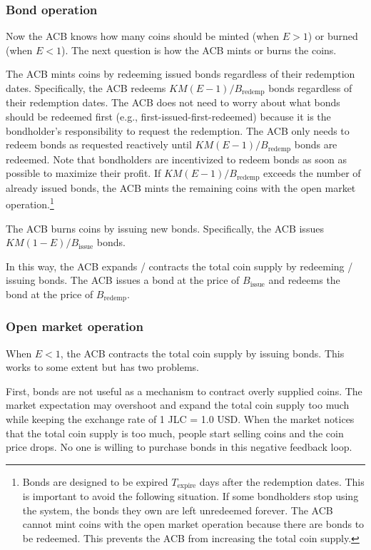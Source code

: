 \documentclass[dvipdfmx,a4paper]{article}
\begin{document}
\subsubsection{Bond operation}

Now the ACB knows how many coins should be minted (when $E>1$) or burned (when $E<1$). The next question is how the ACB mints or burns the coins.

The ACB mints coins by redeeming issued bonds regardless of their redemption dates. Specifically, the ACB redeems $KM(E-1)/B_{\mathrm{redemp}}$ bonds regardless of their redemption dates. The ACB does not need to worry about what bonds should be redeemed first (e.g., first-issued-first-redeemed) because it is the bondholder's responsibility to request the redemption. The ACB only needs to redeem bonds as requested reactively until $KM(E-1)/B_{\mathrm{redemp}}$ bonds are redeemed. Note that bondholders are incentivized to redeem bonds as soon as possible to maximize their profit. If $KM(E-1)/B_{\mathrm{redemp}}$ exceeds the number of already issued bonds, the ACB mints the remaining coins with the open market operation.\footnote{Bonds are designed to be expired $T_{\mathrm{expire}}$ days after the redemption dates. This is important to avoid the following situation. If some bondholders stop using the system, the bonds they own are left unredeemed forever. The ACB cannot mint coins with the open market operation because there are bonds to be redeemed. This prevents the ACB from increasing the total coin supply.}

The ACB burns coins by issuing new bonds. Specifically, the ACB issues $KM(1-E)/B_{\mathrm{issue}}$ bonds.

In this way, the ACB expands / contracts the total coin supply by redeeming / issuing bonds. The ACB issues a bond at the price of $B_{\mathrm{issue}}$ and redeems the bond at the price of $B_{\mathrm{redemp}}$.

\subsubsection{Open market operation}

When $E<1$, the ACB contracts the total coin supply by issuing bonds. This works to some extent but has two problems.

First, bonds are not useful as a mechanism to contract overly supplied coins. The market expectation may overshoot and expand the total coin supply too much while keeping the exchange rate of 1 JLC = 1.0 USD. When the market notices that the total coin supply is too much, people start selling coins and the coin price drops. No one is willing to purchase bonds in this negative feedback loop.
\end{document}

